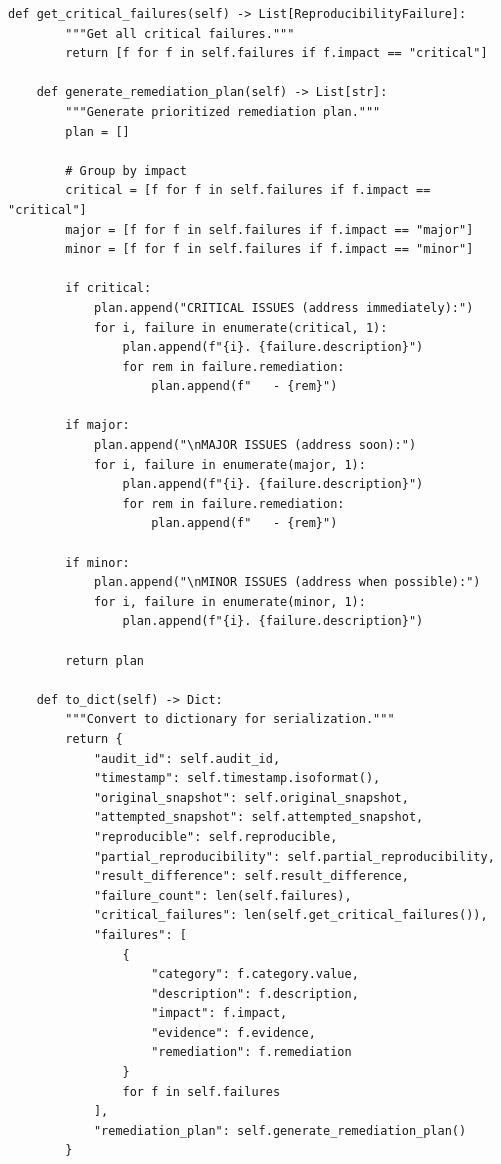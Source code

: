 \begin{lstlisting}[style=python, caption={Post-incident reproducibility audit framework}]
    def get_critical_failures(self) -> List[ReproducibilityFailure]:
        """Get all critical failures."""
        return [f for f in self.failures if f.impact == "critical"]

    def generate_remediation_plan(self) -> List[str]:
        """Generate prioritized remediation plan."""
        plan = []

        # Group by impact
        critical = [f for f in self.failures if f.impact == "critical"]
        major = [f for f in self.failures if f.impact == "major"]
        minor = [f for f in self.failures if f.impact == "minor"]

        if critical:
            plan.append("CRITICAL ISSUES (address immediately):")
            for i, failure in enumerate(critical, 1):
                plan.append(f"{i}. {failure.description}")
                for rem in failure.remediation:
                    plan.append(f"   - {rem}")

        if major:
            plan.append("\nMAJOR ISSUES (address soon):")
            for i, failure in enumerate(major, 1):
                plan.append(f"{i}. {failure.description}")
                for rem in failure.remediation:
                    plan.append(f"   - {rem}")

        if minor:
            plan.append("\nMINOR ISSUES (address when possible):")
            for i, failure in enumerate(minor, 1):
                plan.append(f"{i}. {failure.description}")

        return plan

    def to_dict(self) -> Dict:
        """Convert to dictionary for serialization."""
        return {
            "audit_id": self.audit_id,
            "timestamp": self.timestamp.isoformat(),
            "original_snapshot": self.original_snapshot,
            "attempted_snapshot": self.attempted_snapshot,
            "reproducible": self.reproducible,
            "partial_reproducibility": self.partial_reproducibility,
            "result_difference": self.result_difference,
            "failure_count": len(self.failures),
            "critical_failures": len(self.get_critical_failures()),
            "failures": [
                {
                    "category": f.category.value,
                    "description": f.description,
                    "impact": f.impact,
                    "evidence": f.evidence,
                    "remediation": f.remediation
                }
                for f in self.failures
            ],
            "remediation_plan": self.generate_remediation_plan()
        }



\end{lstlisting}
